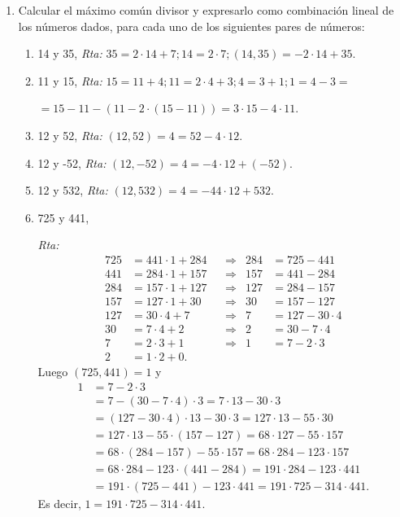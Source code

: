 \documentclass[12pt,spanish,makeidx]{amsbook}
\newcommand{\rta}{\noindent\textit{Rta: }}
\begin{document}
\begin{enumerate}
\noindent\textit{Rta 4: } $4999=4\cdot1109+ 563; 1109=2\cdot 563-17; 563=33\cdot 17+2; 17=8\cdot 2+1$. Por lo tanto $(-1109,-4999)=1$.
\smallskip

\item
Calcular el máximo común divisor y expresarlo como combinaci\'on lineal de los
números dados, para cada uno de  los siguientes pares de números:
\begin{enumerate}
	\item 	14 y 35, \rta $35=2\cdot14+7; 14=2\cdot7; (14, 35)=-2\cdot 14+35$.
	\item 11 y 15, \rta  $15=11+4; 11=2\cdot4+3; 4=3+1; 1= 4-3=$\par\quad\quad\quad\quad\quad$=15-11- (11-2\cdot(15-11))=3\cdot 15-4\cdot11$.
	\item 12 y 52, \rta  $(12, 52)=4=52-4\cdot12$.
	\item  12 y -52, \rta  $(12, -52)=4=-4\cdot 12+(-52)$.
	\item 12 y 532,  \rta  $ (12,532)=4=-44\cdot 12+532$.
	\item  725 y 441,
	
	\rta \begin{align*}
	725 &= 441 \cdot 1 + 284 &&\Rightarrow& 284 &= 725 - 441 \\
	441 &= 284 \cdot 1 +157 &&\Rightarrow& 157 &= 441-284 \\
	284 &= 157 \cdot 1 + 127 &&\Rightarrow& 127 &=284-157 \\
	157 &= 127 \cdot 1 + 30 &&\Rightarrow& 30 &= 157 - 127 \\
	127 &= 30 \cdot 4  + 7 &&\Rightarrow& 7 &= 127-30 \cdot 4 \\
	30 &= 7 \cdot 4 + 2  &&\Rightarrow& 2 &= 30 -7 \cdot 4 \\
	7 &= 2 \cdot 3 + 1  &&\Rightarrow& 1 &= 7- 2 \cdot 3 \\
	2 &= 1 \cdot 2 + 0.
	\end{align*} 
	Luego $(725,441)=1$ y
	\begin{align*}
	1 &= 7- 2  \cdot 3 \\
	& =  7- (30 -7 \cdot 4)  \cdot 3 = 7 \cdot 13 - 30 \cdot 3 \\
	&= (127-30 \cdot 4 ) \cdot 13 - 30 \cdot 3= 127\cdot 13 - 55 \cdot 30 \\
	&=  127\cdot 13 - 55 \cdot (157 - 127) = 68\cdot 127 - 55\cdot 157 \\
	&=  68\cdot (284-157) - 55\cdot 157 = 68\cdot 284 - 123 \cdot 157 \\
	&= 68\cdot 284 - 123 \cdot (441-284)= 191\cdot 284 - 123\cdot 441\\
	&= 191\cdot (725 - 441) - 123\cdot 441= 191 \cdot 725 - 314 \cdot 441.	
	\end{align*}
	Es decir, $1 = 191 \cdot 725 - 314 \cdot 441$.
	

\end{enumerate}
\end{enumerate}
\end{document}
